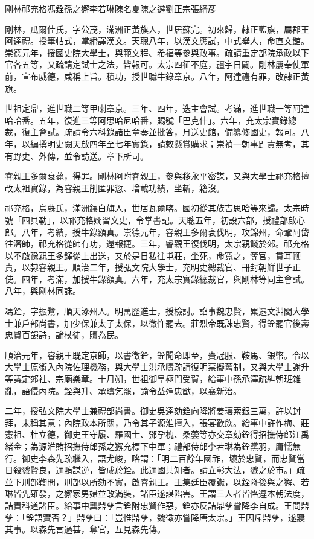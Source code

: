 
\begin{pinyinscope}
剛林祁充格馮銓孫之獬李若琳陳名夏陳之遴劉正宗張縉彥

剛林，瓜爾佳氏，字公茂，滿洲正黃旗人，世居蘇完。初來歸，隸正藍旗，屬郡王阿達禮。授筆帖式，掌繙譯漢文。天聰八年，以漢文應試，中式舉人，命直文館。崇德元年，授國史院大學士，與範文程、希福等參與政事。疏請重定部院承政以下官各五等，又疏請定試士之法，皆報可。太宗四征不庭，疆宇日闢。剛林屢奉使軍前，宣布威德，咸稱上旨。積功，授世職牛錄章京。八年，阿達禮有罪，改隸正黃旗。

世祖定鼎，進世職二等甲喇章京。三年、四年，迭主會試。考滿，進世職一等阿達哈哈番。五年，復進三等阿思哈尼哈番，賜號「巴克什」。六年，充太宗實錄總裁，復主會試。疏請令六科錄諸臣章奏並批答，月送史館，備纂修國史，報可。八年，以編撰明史闕天啟四年至七年實錄，請敕懸賞購求；崇禎一朝事𧾷責無考，其有野史、外傳，並令訪送。章下所司。

睿親王多爾袞薨，得罪。剛林阿附睿親王，參與移永平密謀，又與大學士祁充格擅改太祖實錄，為睿親王削匿罪愆、增載功績，坐斬，籍沒。

祁充格，烏蘇氏，滿洲鑲白旗人，世居瓦爾喀。國初從其族吉思哈等來歸。太宗時號「四貝勒」，以祁充格嫺習文史，令掌書記。天聰五年，初設六部，授禮部啟心郎。八年，考績，授牛錄額真。崇德元年，睿親王多爾袞伐明，攻錦州，命鞏阿岱往濟師，祁充格從師有功，還報捷。三年，睿親王復伐明，太宗親餞於郊。祁充格以不啟豫親王多鐸從上出送，又於是日私往屯莊，坐死，命寬之，奪官，貫耳鞭責，以隸睿親王。順治二年，授弘文院大學士，充明史總裁官、冊封朝鮮世子正使。四年，考滿，加授牛錄額真。六年，充太宗實錄總裁官，與剛林等同主會試。八年，與剛林同誅。

馮銓，字振鷺，順天涿州人。明萬歷進士，授檢討。諂事魏忠賢，累遷文淵閣大學士兼戶部尚書，加少保兼太子太保，以微忤罷去。莊烈帝既誅忠賢，得銓罷官後壽忠賢百韻詩，論杖徒，贖為民。

順治元年，睿親王既定京師，以書徵銓，銓聞命即至，賚冠服、鞍馬、銀幣。令以大學士原銜入內院佐理機務，與大學士洪承疇疏請復明票擬舊制，又與大學士謝升等議定郊社、宗廟樂章。十月朔，世祖御皇極門受賀，給事中孫承澤疏糾朝班雜亂，語侵內院。銓與升、承疇乞罷，諭令益殫忠猷，以襄新治。

二年，授弘文院大學士兼禮部尚書。御史吳達劾銓向降將姜瓖索銀三萬，許以封拜，未稱其意；內院政本所關，乃令其子源淮擅入，張宴歡飲。給事中許作梅、莊憲祖、杜立德，御史王守履、羅國士、鄧孕槐、桑蕓等亦交章劾銓得招撫侍郎江禹緒金；為源淮賄招撫侍郎孫之獬充標下中軍；禮部侍郎李若琳為銓黨羽，庸懦無行。御史李森先疏繼入，語尤峻，略謂：「明二百餘年國祚，壞於忠賢，而忠賢當日殺戮賢良，通賄謀逆，皆成於銓。此通國共知者。請立彰大法，戮之於市。」疏並下刑部鞫問，刑部以所劾不實，啟睿親王。王集廷臣覆讞，以銓降後與之獬、若琳皆先薙發，之獬家男婦並改滿裝，諸臣遂謀陷害。王謂三人者皆恪遵本朝法度，詰責科道諸臣。給事中龔鼎孳言銓附忠賢作惡，銓亦反詰鼎孳嘗降李自成。王問鼎孳：「銓語實否？」鼎孳曰：「豈惟鼎孳，魏徵亦嘗降唐太宗。」王因斥鼎孳，遂寢其事。以森先言過甚，奪官，互見森先傳。


\end{pinyinscope}
